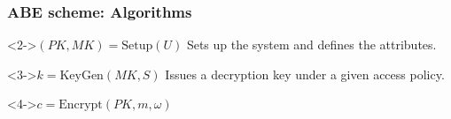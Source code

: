 \begin{frame}[c]
    \frametitle{ABE scheme: Algorithms}
    \begin{minipage}[t]{0.49\textwidth}
        \begin{center}
        \end{center}
        \vspace{0.5cm}
        \begin{block}<2->{\centering $(PK, MK) = \text{Setup}(U)$}
            \centering
            Sets up the system and defines the attributes.
        \end{block}
        \vspace{0.5cm}
        \begin{block}<3->{\centering $k = \text{KeyGen}(MK, S)$}
            \centering
            Issues a decryption key under a given access policy.
        \end{block}
    \end{minipage}
    \begin{minipage}[t]{0.49\textwidth}
        \begin{center}
        \end{center}
        \vspace{0.5cm}
        \begin{block}<4->{\centering $c = \text{Encrypt}(PK, m, \omega)$}

\end{block}
\end{minipage}
\end{frame}
